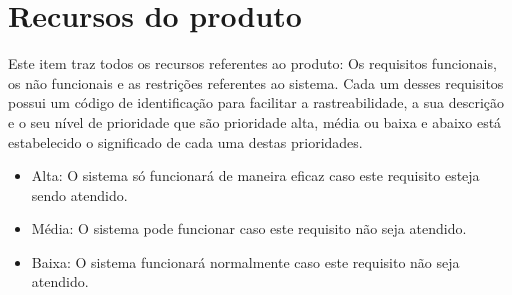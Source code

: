 \section*{Recursos do produto}
Este item traz todos os recursos referentes ao produto: Os requisitos funcionais, os não funcionais e as restrições referentes ao sistema. Cada um desses requisitos possui um código de identificação para facilitar a rastreabilidade, a sua descrição e o seu nível de prioridade que são prioridade alta, média ou baixa e abaixo está estabelecido o significado de cada uma destas prioridades.
\begin{itemize}
\item Alta:  O sistema só funcionará de maneira eficaz caso este requisito esteja sendo atendido.
\item Média: O sistema pode 	funcionar caso este requisito não seja atendido.	
\item Baixa: O sistema funcionará 	normalmente caso este requisito não seja atendido.
\end{itemize}

